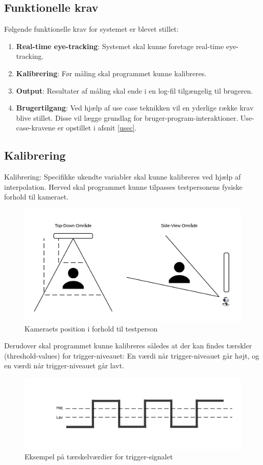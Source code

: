 \documentclass[rapport.tex]{subfiles}
\begin{document}
	\subsection{Funktionelle krav}
	Følgende funktionelle krav for systemet er blevet stillet: \\
	\begin{enumerate}
		\item 
		\textbf{Real-time eye-tracking}: Systemet skal kunne foretage real-time eye-tracking.
		\item 
		\textbf{Kalibrering}: Før måling skal programmet kunne kalibreres.
		\item
		\textbf{Output}: Resultater af måling skal ende i en log-fil tilgængelig til brugeren.
		\item
		\textbf{Brugertilgang}: Ved hjælp af use case teknikken vil en yderlige række krav blive stillet. Disse vil lægge grundlag for bruger-program-interaktioner. Use-case-kravene er opstillet i afsnit \ref{usec}.  
	\end{enumerate}
	
	\subsection{Kalibrering}
	Kalibrering: Specifikke ukendte variabler skal kunne kalibreres ved hjælp af interpolation. Herved skal programmet kunne tilpasses testpersonens fysiske forhold til kameraet. 
	\begin{figure}[h]
		\centering
		\includegraphics[width=0.7\linewidth]{../Kamera-testperson}
		\caption{Kameraets position i forhold til testperson}
		\label{fig:Camposition}
	\end{figure}
	
	
	Derudover skal programmet kunne kalibreres således at der kan findes tærskler (threshold-values) for trigger-niveauet: En værdi når trigger-niveauet går højt, og en værdi når trigger-niveauet går lavt.
	
	\begin{figure}[H]
		\centering
		\includegraphics[width=0.7\linewidth]{../Trigger-threshold}
		\caption{Eksempel på tærskelværdier for trigger-signalet}
		\label{fig:Trigger-threshold}
	\end{figure}
	
\end{document}

